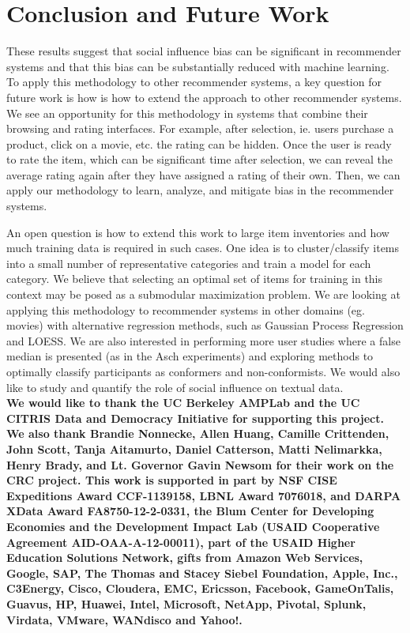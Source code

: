 \section{Conclusion and Future Work}
These results suggest that social influence bias can be significant in
recommender systems and that this bias can be substantially reduced
with machine learning. 
To apply this methodology to other recommender systems, a key question
for future work is how is how to extend the approach to other recommender systems.
We see an opportunity for this methodology in systems that combine their browsing and rating interfaces.
For example, after selection, ie. users purchase a product, click on a movie, etc. the rating can be hidden.
Once the user is ready to rate the item, which can be significant time after selection, we can reveal the average rating again after they have assigned a rating of their own. 
Then, we can apply our methodology to learn, analyze, and mitigate bias in the recommender systems.

An open question is how to extend this work to large item inventories and how much training data is required in such cases.  
One idea is to cluster/classify items into a small number of representative categories and train a model for each category.  
We believe that selecting an optimal set of items for training in this context may be posed as a submodular maximization problem.  
We are looking at applying this methodology to recommender systems in other domains (eg. movies) with alternative regression methods, such as Gaussian Process Regression and LOESS.
We are also interested in performing more user studies where a false median is presented (as in the Asch experiments) and exploring methods to
optimally classify participants as conformers and non-conformists.  
We would also like to study and quantify the role of social influence on textual data.\\
\scriptsize
\textbf{We would like to thank the UC Berkeley AMPLab and the UC CITRIS Data and Democracy Initiative for supporting this project. We also thank Brandie Nonnecke, Allen Huang, Camille Crittenden, John Scott, Tanja Aitamurto, Daniel Catterson, Matti Nelimarkka, Henry Brady, and Lt. Governor Gavin Newsom for their work on the CRC project. This work is supported in part by NSF CISE Expeditions Award CCF-1139158, LBNL Award 7076018, and DARPA XData Award FA8750-12-2-0331, the Blum Center for Developing Economies and the Development Impact Lab (USAID Cooperative Agreement AID-OAA-A-12-00011), part of the USAID Higher Education Solutions Network, gifts from Amazon Web Services, Google, SAP,  The Thomas and Stacey Siebel Foundation, Apple, Inc., C3Energy, Cisco, Cloudera, EMC, Ericsson, Facebook, GameOnTalis, Guavus, HP, Huawei, Intel, Microsoft, NetApp, Pivotal, Splunk, Virdata, VMware, WANdisco and Yahoo!.}\\




